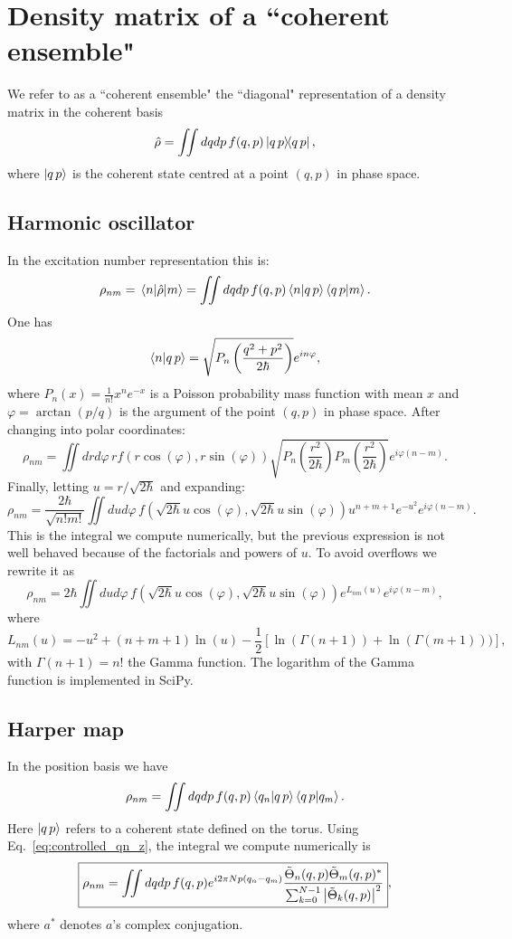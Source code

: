 \documentclass[12pt]{article}
\newcommand{\qp}{q\,p}
\newcommand{\vphi}{\varphi}
\newcommand{\hrho}{\hat{\rho}} %
\begin{document}
\section{Density matrix of a ``coherent ensemble"}
We refer to as a ``coherent ensemble" the ``diagonal" representation of a density matrix in the coherent basis
\begin{equation}
    \hrho = \iint dqdp\, f(q,p) \ketbra{\qp},
    \label{eq:coherent_ensemble}
\end{equation}
where $\ket{\qp}$ is the coherent state centred at a point $(q, p)$ in phase space.

\subsection{Harmonic oscillator}
In the excitation number representation this is:
$$
\rho_{nm} = \mel{n}{\hrho}{m} = \iint dqdp\, f(q,p) \braket{n}{\qp}\braket{\qp}{m}.
$$
One has
$$
\braket{n}{\qp} = \sqrt{ P_n\left(\frac{q^2 + p^2}{2\hbar}\right) } e^{in\vphi},
$$
where $P_n(x)= \frac{1}{n!} x^n e^{-x}$ is a Poisson probability mass function with mean $x$
and $\varphi = \arctan(p/q)$ is the argument of the point $(q, p)$ in phase space.
After changing into polar coordinates:
$$
\rho_{nm} = \iint drd\vphi\, r f(r\cos(\vphi), r\sin(\vphi))
\sqrt{ P_n\left(\frac{r^2}{2\hbar}\right) P_m\left(\frac{r^2}{2\hbar}\right) } e^{i\vphi(n-m)}.
$$
Finally, letting $u = r/\sqrt{2\hbar}$ and expanding:
$$
\rho_{nm} = \frac{2\hbar}{\sqrt{n! m!}} \iint dud\vphi\,
f\left(\sqrt{2\hbar}u\cos(\vphi), \sqrt{2\hbar}u\sin(\vphi)\right)
u^{n+m+1} e^{-u^2} e^{i\vphi(n - m)}.
$$
This is the integral we compute numerically, but the previous expression is not well behaved because of the factorials and powers of $u$.
To avoid overflows we rewrite it as
$$
\boxed{
\rho_{nm} = 2\hbar \iint dud\vphi\,
f\left(\sqrt{2\hbar}u\cos(\vphi), \sqrt{2\hbar}u\sin(\vphi)\right) e^{L_{nm}(u)} e^{i\vphi(n - m)}
},
$$
where
$$
L_{nm}(u) = -u^2 + (n+m+1)\ln(u) - \frac{1}{2}[\ln(\Gamma(n+1))+\ln(\Gamma(m+1)))],
$$
with $\Gamma(n+1) = n!$ the Gamma function.
The logarithm of the Gamma function is implemented in SciPy.

\subsection{Harper map}
In the position basis we have
$$
\rho_{nm} = \iint dqdp\, f(q,p) \braket{q_n}{\qp}\braket{\qp}{q_m}.
$$
Here $\ket{\qp}$ refers to a coherent state defined on the torus.
Using Eq.~\eqref{eq:controlled_qn_z}, the integral we compute numerically is
$$
\boxed{
\rho_{nm} = \iint dqdp\, f(q,p) e^{i 2\pi N p (q_n - q_m)}
\frac{\tilde{\Theta}_n(q, p) \tilde{\Theta}_m(q, p)^*}{\sum_{k=0}^{N-1} \abs{\tilde{\Theta}_k(q, p)}^2 }
},
$$
where $a^*$ denotes $a$'s complex conjugation.
\end{document}
